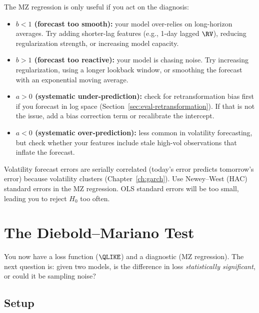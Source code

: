 \begin{keyidea}
The MZ regression is only useful if you act on the diagnosis:
\begin{itemize}[nosep]
  \item \textbf{$b < 1$ (forecast too smooth):} your model over-relies on long-horizon averages. Try adding shorter-lag features (e.g., 1-day lagged $\RV$), reducing regularization strength, or increasing model capacity.
  \item \textbf{$b > 1$ (forecast too reactive):} your model is chasing noise. Try increasing regularization, using a longer lookback window, or smoothing the forecast with an exponential moving average.
  \item \textbf{$a > 0$ (systematic under-prediction):} check for retransformation bias first if you forecast in log space (Section~\ref{sec:eval-retransformation}). If that is not the issue, add a bias correction term or recalibrate the intercept.
  \item \textbf{$a < 0$ (systematic over-prediction):} less common in volatility forecasting, but check whether your features include stale high-vol observations that inflate the forecast.
\end{itemize}
\end{keyidea}

\begin{warning}
Volatility forecast errors are serially correlated (today's error predicts tomorrow's error) because volatility clusters (Chapter~\ref{ch:garch}).
Use Newey--West (HAC) standard errors in the MZ regression.
OLS standard errors will be too small, leading you to reject $H_0$ too often.
\end{warning}


\section{The Diebold--Mariano Test}
\label{sec:eval-dm}

You now have a loss function ($\QLIKE$) and a diagnostic (MZ regression).
The next question is: given two models, is the difference in loss \emph{statistically significant}, or could it be sampling noise?

\subsection{Setup}

